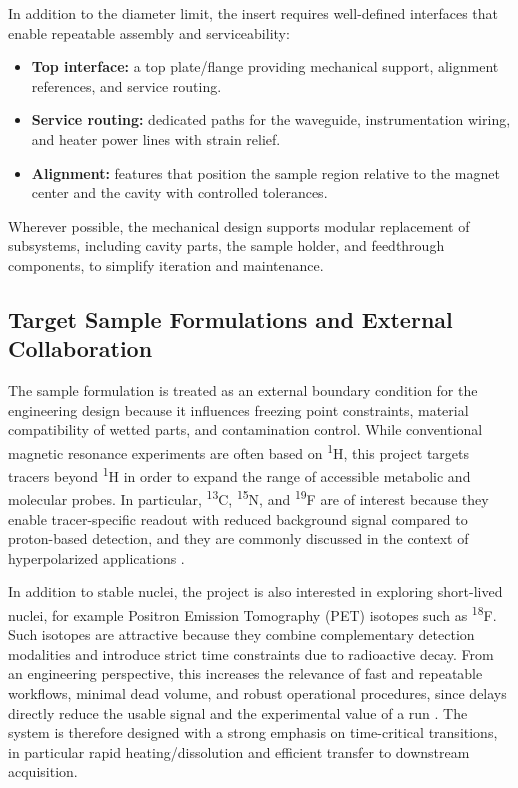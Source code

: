 \documentclass[FM,DP,EN,twoside]{tulthesis}
\begin{document}
In addition to the diameter limit, the insert requires well-defined interfaces that enable repeatable assembly and serviceability:
\begin{itemize}
  \item \textbf{Top interface:} a top plate/flange providing mechanical support, alignment references, and service routing.
  \item \textbf{Service routing:} dedicated paths for the waveguide, instrumentation wiring, and heater power lines with strain relief.
  \item \textbf{Alignment:} features that position the sample region relative to the magnet center and the cavity with controlled tolerances.
\end{itemize}
Wherever possible, the mechanical design supports modular replacement of subsystems, including cavity parts, the sample holder, and feedthrough components, to simplify iteration and maintenance.


\subsection{Target Sample Formulations and External Collaboration}
\label{subsec:target-samples-hug}
The sample formulation is treated as an external boundary condition for the engineering design because it influences freezing point constraints, material compatibility of wetted parts, and contamination control. While conventional magnetic resonance experiments are often based on \textsuperscript{1}H, this project targets tracers beyond \textsuperscript{1}H in order to expand the range of accessible metabolic and molecular probes. In particular, \textsuperscript{13}C, \textsuperscript{15}N, and \textsuperscript{19}F are of interest because they enable tracer-specific readout with reduced background signal compared to proton-based detection, and they are commonly discussed in the context of hyperpolarized applications \cite{hyperpolarized_tracers_review}.

In addition to stable nuclei, the project is also interested in exploring short-lived nuclei, for example Positron Emission Tomography (PET) isotopes such as \textsuperscript{18}F. Such isotopes are attractive because they combine complementary detection modalities and introduce strict time constraints due to radioactive decay. From an engineering perspective, this increases the relevance of fast and repeatable workflows, minimal dead volume, and robust operational procedures, since delays directly reduce the usable signal and the experimental value of a run \cite{PET_hyperpolarization_ref}. The system is therefore designed with a strong emphasis on time-critical transitions, in particular rapid heating/dissolution and efficient transfer to downstream acquisition.
\end{document}
